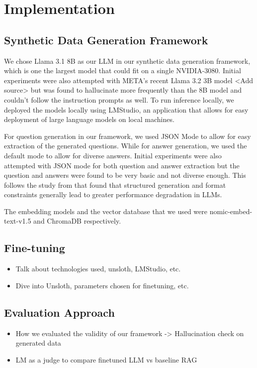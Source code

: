 \section{Implementation}\label{sec:implementation}


\subsection{Synthetic Data Generation Framework}

We chose Llama 3.1 8B as our LLM in our synthetic data generation framework, which is one the largest model that could fit on a single NVIDIA-3080. Initial experiments
were also attempted with META's recent Llama 3.2 3B model <Add source> but was found to hallucinate more frequently than the 8B model and couldn't follow the instruction prompts as well.
To run inference locally, we deployed the models locally using LMStudio, an application that allows for easy deployment of large language models on local machines.

For question generation in our framework, we used JSON Mode to allow for easy extraction of the generated questions. While for answer generation, we used the default
mode to allow for diverse answers. Initial experiments were also attempted with JSON mode for both question and answer extraction but the question and answers
were found to be very basic and not diverse enough. This follows the study from \cite{tam2024letspeakfreelystudy} that found that structured generation and format constraints
generally lead to greater performance degradation in LLMs.

The embedding models and the vector database that we used were nomic-embed-text-v1.5 and ChromaDB respectively.

\subsection{Fine-tuning}

\begin{itemize}
    \item Talk about technologies used, unsloth, LMStudio, etc.
    \item Dive into Unsloth, parameters chosen for finetuning, etc.
\end{itemize}

\subsection{Evaluation Approach}
\begin{itemize}
\item How we evaluated the validity of our framework -> Hallucination check on generated data
\item LM as a judge to compare finetuned LLM vs baseline RAG
\end{itemize}

